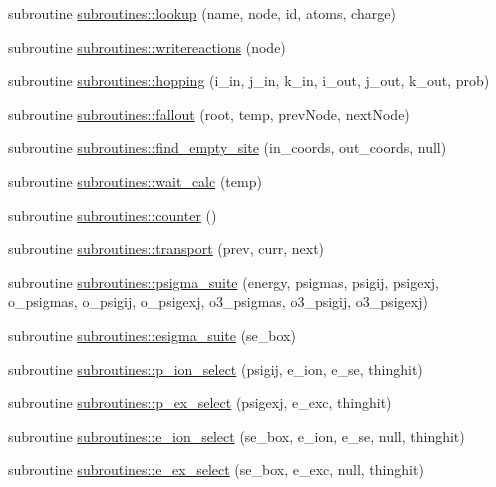 \begin{DoxyCompactItemize}
\item 
subroutine \hyperlink{namespacesubroutines_a27505ee5071c93bb5f1e570995a1ac42}{subroutines::lookup} (name, node, id, atoms, charge)
\item 
subroutine \hyperlink{namespacesubroutines_a0ce9ee9331d3c0bba11e3e00fbd7e07b}{subroutines::writereactions} (node)
\item 
subroutine \hyperlink{namespacesubroutines_ad97e0b9db9cfe6329f9f8fdb886077e7}{subroutines::hopping} (i\_\-in, j\_\-in, k\_\-in, i\_\-out, j\_\-out, k\_\-out, prob)
\item 
subroutine \hyperlink{namespacesubroutines_a7a31d5c9fbda24651c932b0466618567}{subroutines::fallout} (root, temp, prevNode, nextNode)
\item 
subroutine \hyperlink{namespacesubroutines_af4c69699bd3e0e4aa05607a7e94044dc}{subroutines::find\_\-empty\_\-site} (in\_\-coords, out\_\-coords, null)
\item 
subroutine \hyperlink{namespacesubroutines_ac847bd99eab89bdc881d885b2808624d}{subroutines::wait\_\-calc} (temp)
\item 
subroutine \hyperlink{namespacesubroutines_af250b65cb2805243dd52e4e3535f4c5a}{subroutines::counter} ()
\item 
subroutine \hyperlink{namespacesubroutines_a0a51843cbd2415487f29e4314e1de97a}{subroutines::transport} (prev, curr, next)
\item 
subroutine \hyperlink{namespacesubroutines_a37b9d3b519b164f5ef3835bf4e1e4f8c}{subroutines::psigma\_\-suite} (energy, psigmas, psigij, psigexj, o\_\-psigmas, o\_\-psigij, o\_\-psigexj, o3\_\-psigmas, o3\_\-psigij, o3\_\-psigexj)
\item 
subroutine \hyperlink{namespacesubroutines_a27620c6392f4cd49238c295cbe60e179}{subroutines::esigma\_\-suite} (se\_\-box)
\item 
subroutine \hyperlink{namespacesubroutines_a3185cd857374fa3b0a19f2a56e6474df}{subroutines::p\_\-ion\_\-select} (psigij, e\_\-ion, e\_\-se, thinghit)
\item 
subroutine \hyperlink{namespacesubroutines_acad706394e0b01bbd1e5345585dace59}{subroutines::p\_\-ex\_\-select} (psigexj, e\_\-exc, thinghit)
\item 
subroutine \hyperlink{namespacesubroutines_acad777e3f27acb4f7e0f7b35035ae54a}{subroutines::e\_\-ion\_\-select} (se\_\-box, e\_\-ion, e\_\-se, null, thinghit)
\item 
subroutine \hyperlink{namespacesubroutines_a0f09eb60b63730612ddd7801066ce49b}{subroutines::e\_\-ex\_\-select} (se\_\-box, e\_\-exc, null, thinghit)

\end{DoxyCompactItemize}
